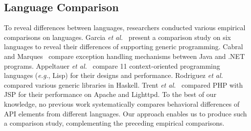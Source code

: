 \subsection{Language Comparison} To reveal differences between languages, researchers conducted various empirical comparisons on languages. Garcia \emph{et al.}~\citep{Garcia2003} present a comparison study on six languages to reveal their differences of supporting generic programming. Cabral and Marques~\citep{cabral2007exception} compare exception handling mechanisms between Java and .NET programs. Appeltauer \emph{et al.}~\citep{appeltauer2009comparison} compare 11 context-oriented programming languages (\emph{e.g.}, Lisp) for their designs and performance. Rodriguez \emph{et al.}~\citep{yakushevcomparing} compared various generic libraries in Haskell. Trent \emph{et al.}~\citep{trent2008performance} compared PHP with JSP for their performance on Apache and Lighttpd.
To the best of our knowledge, no previous work systematically compares behavioral differences of API elements from different languages. Our approach enables us to produce such a comparison study, complementing the preceding empirical comparisons.


